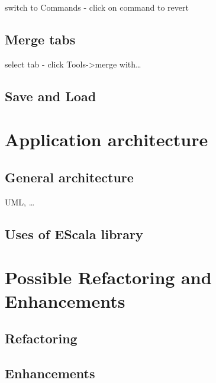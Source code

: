 \documentclass[12pt, accentcolor=tud9c, linedtoc, bigchapter, colorback, noresetcounter, numbersubsubsec]{tudreport}
\begin{document}
switch to Commands - click on command to revert


\section{Merge tabs}

select tab - click Tools->merge with\dots

\section{Save and Load}

\chapter{Application architecture}

\section{General architecture}
UML, \dots

\section{Uses of EScala library}

\chapter{Possible Refactoring and Enhancements}

\section{Refactoring}

\section{Enhancements}
\end{document}
